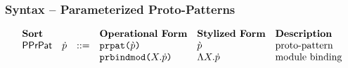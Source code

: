 \subsubsection{Syntax -- Parameterized Proto-Patterns}
\[\begin{array}{lllllll}
\textbf{Sort} & & & \textbf{Operational Form} & \textbf{Stylized Form} & \textbf{Description}\\
\mathsf{PPrPat} & \pcp & ::= & \apcepat{\cpv} & {\cpv} & \text{proto-pattern}\\
&&& \apcebindmod{X}{\pcp} & \pcebindmod{X}{\pcp} & \text{module binding}%
\end{array}\]

